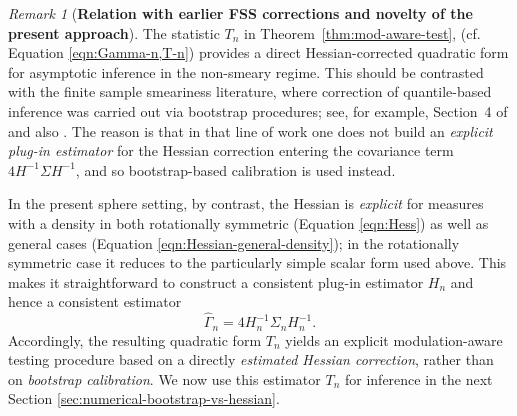 \documentclass{amsart}
\theoremstyle{definition}
\theoremstyle{remark}
\newtheorem{remark}[theorem]{Remark}
\newcommand\0{\boldsymbol{0}}
\begin{document}
\noindent
\begin{remark}[\textbf{Relation with earlier FSS corrections and novelty of the present approach}]
The statistic $T_n$ in Theorem~\ref{thm:mod-aware-test}, (cf. Equation \eqref{eqn:Gamma-n,T-n}) provides a direct Hessian-corrected quadratic form for asymptotic inference in the non-smeary regime. This should be contrasted with the finite sample smeariness literature, where correction of quantile-based inference was carried out via bootstrap procedures; see, for example, Section~4 of \cite{EltznerFSSonspheres} and also \cite{HH2}. The reason is that in that line of work one does not build an \textit{explicit plug-in estimator} for the Hessian correction entering the covariance term $4H^{-1}\Sigma H^{-1}$, and so bootstrap-based calibration is used instead.

In the present sphere setting, by contrast, the Hessian is \textit{explicit} for measures with a density in both rotationally symmetric (Equation \eqref{eqn:Hess}) as well as general cases (Equation \eqref{eqn:Hessian-general-density}); in the rotationally symmetric case it reduces to the particularly simple scalar form used above. This makes it straightforward to construct a consistent plug-in estimator $H_n$ and hence a consistent estimator
\[
\widehat\Gamma_n=4H_n^{-1}\Sigma_n H_n^{-1}.
\]
Accordingly, the resulting quadratic form $T_n$ yields an explicit modulation-aware testing procedure based on a directly \textit{estimated Hessian correction}, rather than on\textit{ bootstrap calibration}. We now use this estimator $T_n$ for inference in the next Section \ref{sec:numerical-bootstrap-vs-hessian}.
\end{remark}





%
\end{document}
